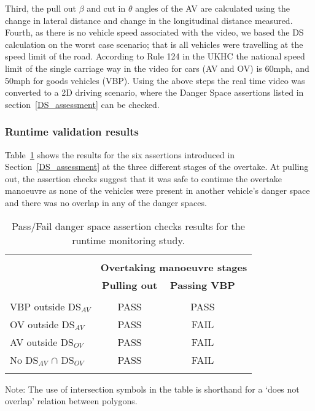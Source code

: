 %
Third, the pull out $\beta$ and cut in $\theta$ angles of the AV are calculated using the change in lateral distance and change in the longitudinal distance measured. Fourth, as there is no vehicle speed associated with the video, we based the DS calculation on the worst case scenario; that is all vehicles were travelling at the speed limit of the road. 
%
According to Rule 124 in the UKHC the national speed limit of the single carriage way in the video for cars (AV and OV) is 60mph, and 50mph for goods vehicles (VBP). Using the above steps the real time video was converted to a 2D driving scenario, where the Danger Space assertions listed in section~\ref{DS_assessment} can be checked.

\subsubsection{Runtime validation results}
Table~\ref{Overtaking_DS_table} shows the results for the six assertions introduced in Section~\ref{DS_assessment} at the three different stages of the overtake. At pulling out, the assertion checks suggest that it was safe to continue the overtake manoeuvre as none of the vehicles were present in another vehicle's danger space and there was no overlap in any of the danger spaces. 

\begin{table}[h]
	\centering
	\begin{tabular}{ lccc }
		\hline
		\\
		\multirow{3}{*}{\textbf{}} & \multicolumn{3}{c}{\textbf{Overtaking manoeuvre stages}}\\
		\textbf{Assertion} & \textbf{Pulling out} & \textbf{Passing VBP} & %
		 \\
		&  &  &  \\
		VBP outside DS$_{AV}$ & PASS & PASS & \\
		OV outside DS$_{AV}$ & PASS & FAIL & \\
		AV outside DS$_{OV}$  & PASS & FAIL & \\
		No DS$_{AV}$ $\cap$ DS$_{OV}$  & PASS & FAIL & \\
		\\
		\hline
	\end{tabular}
	\caption{Pass/Fail danger space assertion checks results for the runtime monitoring study. } \label{Overtaking_DS_table}
\end{table}
Note: The use of intersection symbols in the table is shorthand for a `does not overlap' relation between polygons. 
\vspace{2mm}


